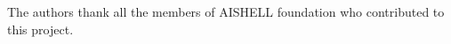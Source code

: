 \documentclass[a4paper]{article}
\begin{document}
The authors thank all the members of AISHELL foundation who contributed to this
project.





\end{document}
